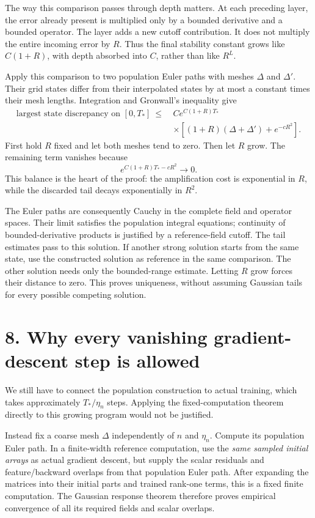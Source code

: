 The way this comparison passes through depth matters. At each preceding
layer, the error already present is multiplied only by a bounded derivative
and a bounded operator. The layer adds a new cutoff contribution. It does
not multiply the entire incoming error by $R$. Thus the final stability
constant grows like $C(1+R)$, with depth absorbed into $C$, rather than
like $R^L$.

Apply this comparison to two population Euler paths with meshes $\Delta$
and $\Delta'$. Their grid states differ from their interpolated states by
at most a constant times their mesh lengths. Integration and Gronwall's
inequality give
\[
\begin{split}
\text{largest state discrepancy on }[0,T_*]
\ \le\ & C e^{C(1+R)T_*}\\[-3pt]
&\times\left[(1+R)(\Delta+\Delta')+e^{-cR^2}\right].
\end{split}
\]
First hold $R$ fixed and let both meshes tend to zero. Then let $R$ grow.
The remaining term vanishes because
\[
e^{C(1+R)T_*-cR^2}\longrightarrow0.
\]
This balance is the heart of the proof: the amplification cost is exponential
in $R$, while the discarded tail decays exponentially in $R^2$.

The Euler paths are consequently Cauchy in the complete field and operator
spaces. Their limit satisfies the population integral equations; continuity
of bounded-derivative products is justified by a reference-field cutoff.
The tail estimates pass to this solution. If another strong solution starts
from the same state, use the constructed solution as reference in the same
comparison. The other solution needs only the bounded-range estimate.
Letting $R$ grow forces their distance to zero. This proves uniqueness,
without assuming Gaussian tails for every possible competing solution.

\newpage
\section*{8. Why every vanishing gradient-descent step is allowed}

We still have to connect the population construction to actual training,
which takes approximately $T_*/\eta_n$ steps. Applying the fixed-computation
theorem directly to this growing program would not be justified.

Instead fix a coarse mesh $\Delta$ independently of $n$ and $\eta_n$.
Compute its population Euler path. In a finite-width reference computation,
use the \emph{same sampled initial arrays} as actual gradient descent,
but supply the scalar residuals and feature/backward overlaps from that
population Euler path. After expanding the matrices into their initial
parts and trained rank-one terms, this is a fixed finite computation.
The Gaussian response theorem therefore proves empirical convergence of
all its required fields and scalar overlaps.

